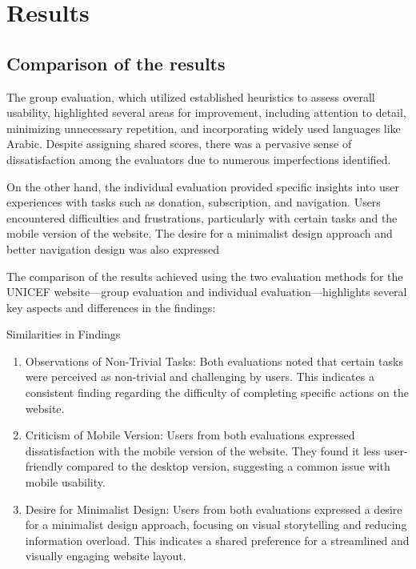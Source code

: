 \section*{Results}

\subsection{Comparison of the results}
The group evaluation, which utilized established heuristics to assess overall
usability, highlighted several areas for improvement, including attention to detail,
minimizing unnecessary repetition, and incorporating widely used languages like
Arabic. Despite assigning shared scores, there was a pervasive sense of
dissatisfaction among the evaluators due to numerous imperfections identified.

On the other hand, the individual evaluation provided specific insights into user
experiences with tasks such as donation, subscription, and navigation. Users
encountered difficulties and frustrations, particularly with certain tasks and the
mobile version of the website. The desire for a minimalist design approach and
better navigation design was also expressed

The comparison of the results achieved using the two evaluation methods for the UNICEF website—group evaluation and individual evaluation—highlights several key aspects and differences in the findings:

Similarities in Findings
\begin{enumerate}
\item Observations of Non-Trivial Tasks: Both evaluations noted that certain
tasks were perceived as non-trivial and challenging by users. This indicates a
consistent finding regarding the difficulty of completing specific actions on
the website.

\item Criticism of Mobile Version: Users from both evaluations expressed
dissatisfaction with the mobile version of the website. They found it less
user-friendly compared to the desktop version, suggesting a common issue
with mobile usability.

\item Desire for Minimalist Design: Users from both evaluations expressed a
desire for a minimalist design approach, focusing on visual storytelling and
reducing information overload. This indicates a shared preference for a
streamlined and visually engaging website layout.
\end{enumerate}

